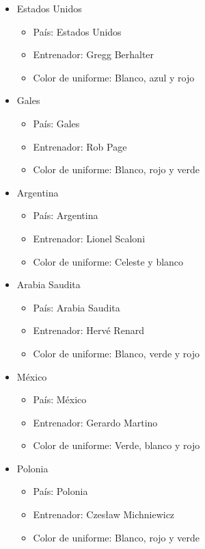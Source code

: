 \begin{itemize}
\begin{itemize}
        \end{itemize}
    \item Estados Unidos
        \begin{itemize}
            \item País: Estados Unidos
            \item Entrenador: Gregg Berhalter
            \item Color de uniforme: Blanco, azul y rojo
        \end{itemize}
    \item Gales
        \begin{itemize}
            \item País: Gales
            \item Entrenador: Rob Page
            \item Color de uniforme: Blanco, rojo y verde
        \end{itemize}
    \item Argentina
        \begin{itemize}
            \item País: Argentina
            \item Entrenador: Lionel Scaloni
            \item Color de uniforme: Celeste y blanco
        \end{itemize}
    \item Arabia Saudita
        \begin{itemize}
            \item País: Arabia Saudita
            \item Entrenador: Hervé Renard
            \item Color de uniforme: Blanco, verde y rojo
        \end{itemize}
    \item México
        \begin{itemize}
            \item País: México
            \item Entrenador: Gerardo Martino
            \item Color de uniforme: Verde, blanco y rojo
        \end{itemize}
    \item Polonia
        \begin{itemize}
            \item País: Polonia
            \item Entrenador: Czesław Michniewicz
            \item Color de uniforme: Blanco, rojo y verde

\end{itemize}
\end{itemize}
